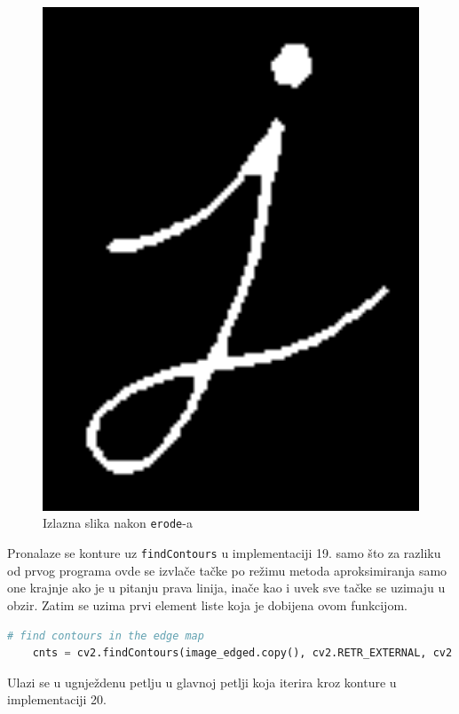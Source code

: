 \documentclass[fontsize=12bp, paper=a4]{scrarticle}
\begin{document}
\begin{figure}[tbp!]
\begin{minipage}[b]{0.25\textwidth}
        \includegraphics[width=1\textwidth]{5.png}
        \caption{\centering Izlazna slika nakon \texttt{erode}-a}
    \end{minipage}
\end{figure}  

Pronalaze se konture uz \verb|findContours| u implementaciji 19. samo što za razliku od prvog programa ovde se izvlače tačke po režimu metoda aproksimiranja samo one krajnje ako je u pitanju prava linija, inače kao i uvek sve tačke se uzimaju u obzir. Zatim se uzima prvi element liste koja je dobijena ovom funkcijom.

\begin{lstlisting}[language=Python, caption={Detekcija kontura}]
    # find contours in the edge map
    cnts = cv2.findContours(image_edged.copy(), cv2.RETR_EXTERNAL, cv2.CHAIN_APPROX_SIMPLE)[0]
\end{lstlisting} 

Ulazi se u ugnježdenu petlju u glavnoj petlji koja iterira kroz konture u implementaciji 20.
\end{document}
